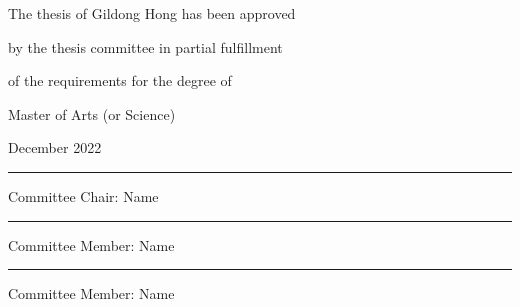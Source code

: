 \documentclass[11pt]{report}
\begin{document}
\newpage 
\begin{center}
\vspace{1cm}
{\fontsize{16pt}{18pt}\selectfont
The thesis of Gildong Hong has been approved \par
by the thesis committee in partial fulfillment\par
of the requirements for the degree of \par
Master of Arts (or Science) \par}  
\vspace{1cm}
{\fontsize{14pt}{14pt}\selectfont December 2022} %
\par\vspace{3cm}
\rule{.6\textwidth}{0.4pt}\par %
{\fontsize{16pt}{16pt}\selectfont Committee Chair: Name \par}
\vspace{1cm}
\rule{.6\textwidth}{0.4pt}\par %
{\fontsize{16pt}{16pt}\selectfont Committee Member: Name \par}
\vspace{1cm}
\rule{.6\textwidth}{0.4pt}\par %
{\fontsize{16pt}{16pt}\selectfont Committee Member: Name \par}
\end{center}


\end{document}
